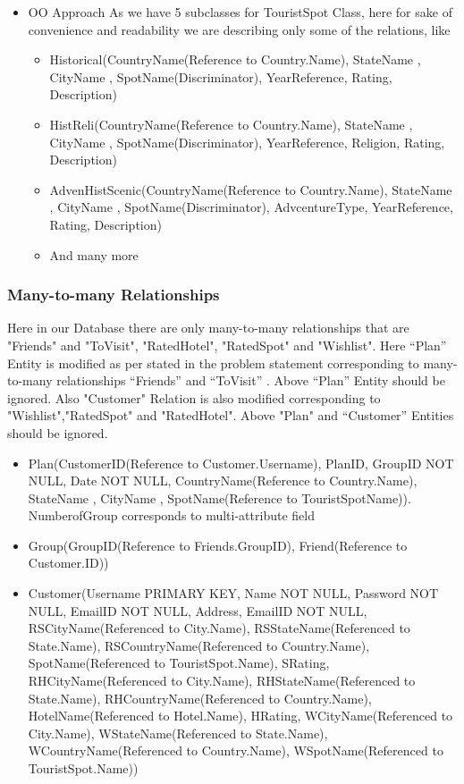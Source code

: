 \documentclass[11pt]{article}
\begin{document}
\begin{itemize}
\begin{itemize}
\begin{itemize}
\end{itemize}
\item OO Approach \newline
As we have 5 subclasses for TouristSpot Class, here for sake of convenience and readability we are describing only some of the relations, like
\begin{itemize}
\item Historical(CountryName(Reference to Country.Name), StateName , CityName , SpotName(Discriminator), YearReference, Rating, Description)
\item HistReli(CountryName(Reference to Country.Name), StateName , CityName , SpotName(Discriminator), YearReference, Religion, Rating, Description)
\item AdvenHistScenic(CountryName(Reference to Country.Name), StateName , CityName , SpotName(Discriminator), AdvcentureType, YearReference, Rating, Description)
\item And many more
\end{itemize}
\end{itemize}
\end{itemize}

\subsubsection{Many-to-many Relationships}
Here in our Database there are only many-to-many relationships that are "Friends" and "ToVisit", "RatedHotel", "RatedSpot" and "Wishlist". Here “Plan” Entity is modified as per stated in the problem statement corresponding to many-to-many relationships “Friends” and “ToVisit” . Above “Plan” Entity should be ignored. Also "Customer" Relation is also modified corresponding to "Wishlist","RatedSpot" and "RatedHotel". Above "Plan" and “Customer” Entities should be ignored.
\begin{itemize}
\item Plan(CustomerID(Reference to Customer.Username), PlanID, GroupID NOT NULL, Date NOT NULL, CountryName(Reference to Country.Name), StateName , CityName , SpotName(Reference to TouristSpotName)). NumberofGroup corresponds to multi-attribute field

\item Group(GroupID(Reference to Friends.GroupID), Friend(Reference to Customer.ID))

\item Customer(Username PRIMARY KEY, Name NOT NULL, Password NOT NULL, EmailID NOT NULL, Address, EmailID NOT NULL, RSCityName(Referenced to City.Name), RSStateName(Referenced to State.Name), RSCountryName(Referenced to Country.Name), SpotName(Referenced to TouristSpot.Name), SRating, RHCityName(Referenced to City.Name), RHStateName(Referenced to State.Name), RHCountryName(Referenced to Country.Name), HotelName(Referenced to Hotel.Name), HRating, WCityName(Referenced to City.Name), WStateName(Referenced to State.Name), WCountryName(Referenced to Country.Name), WSpotName(Referenced to TouristSpot.Name))
\end{itemize}
\end{document}
